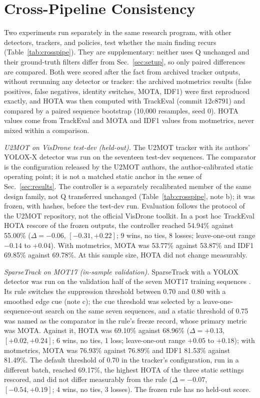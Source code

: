\documentclass[journal]{new-aiaa}
\begin{document}
\section{Cross-Pipeline Consistency}\label{sec:crosspipe}
Two experiments run separately in the same research program, with other detectors, trackers, and policies, test whether the main finding recurs (Table~\ref{tab:crosspipe}). They are supplementary: neither uses Q unchanged and their ground-truth filters differ from Sec.~\ref{sec:setup}, so only paired differences are compared. Both were scored after the fact from archived tracker outputs, without rerunning any detector or tracker: the archived motmetrics results (false positives, false negatives, identity switches, MOTA, IDF1) were first reproduced exactly, and HOTA was then computed with TrackEval (commit 12c8791) and compared by a paired sequence bootstrap (10,000 resamples, seed 0). HOTA values come from TrackEval and MOTA and IDF1 values from motmetrics, never mixed within a comparison.



\emph{U2MOT on VisDrone test-dev (held-out).} The U2MOT tracker \cite{liu2023u2mot} with its authors' YOLOX-X detector \cite{ge2021yolox} was run on the seventeen test-dev sequences. The comparator is the configuration released by the U2MOT authors, the author-calibrated static operating point; it is not a matched static anchor in the sense of Sec.~\ref{sec:results}. The controller is a separately recalibrated member of the same design family, not Q transferred unchanged (Table~\ref{tab:crosspipe}, note b); it was frozen, with hashes, before the test-dev run. Evaluation follows the protocol of the U2MOT repository, not the official VisDrone toolkit. In a post hoc TrackEval HOTA rescore of the frozen outputs, the controller reached 54.94\% against 55.00\% ($\Delta=-0.06$, $[-0.31, +0.22]$; 9 wins, no ties, 8 losses; leave-one-out range $-0.14$ to $+0.04$). With motmetrics, MOTA was 53.77\% against 53.87\% and IDF1 69.85\% against 69.78\%. At this sample size, HOTA did not change measurably.

\emph{SparseTrack on MOT17 (in-sample validation).} SparseTrack \cite{liu2025sparsetrack} with a YOLOX detector was run on the validation half of the seven MOT17 training sequences \cite{milan2016mot16}. Its rule switches the suppression threshold between 0.70 and 0.80 with a smoothed edge cue (note c); the cue threshold was selected by a leave-one-sequence-out search on the same seven sequences, and a static threshold of 0.75 was named as the comparator in the rule's freeze record, whose primary metric was MOTA. Against it, HOTA was 69.10\% against 68.96\% ($\Delta=+0.13$, $[+0.02, +0.24]$; 6 wins, no ties, 1 loss; leave-one-out range $+0.05$ to $+0.18$); with motmetrics, MOTA was 76.93\% against 76.89\% and IDF1 81.53\% against 81.49\%. The default threshold of 0.70 in the tracker's configuration, run in a different batch, reached 69.17\%, the highest HOTA of the three static settings rescored, and did not differ measurably from the rule ($\Delta=-0.07$, $[-0.54, +0.19]$; 4 wins, no ties, 3 losses). The frozen rule has no held-out score.
\end{document}
